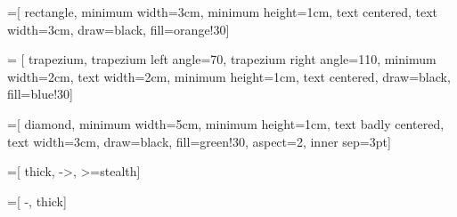 
=[%
	rectangle, 				
	minimum width=3cm,		
	minimum height=1cm, 
	text centered,
	text width=3cm, 
	draw=black, 
	fill=orange!30]

= [%
	trapezium, 
	trapezium left angle=70, 
	trapezium right angle=110, 
	minimum width=2cm,
	text width=2cm, 
	minimum height=1cm,
	text centered, 
	draw=black,
	fill=blue!30]
	
=[%
	diamond, 
	minimum width=5cm, 
	minimum height=1cm, 
	text badly centered, 
	text width=3cm, 
	draw=black, 
	fill=green!30,
	aspect=2, 
	inner sep=3pt]
	
=[%
	thick,
	->, 
	>=stealth]

=[%
	-, 
	thick]
	





